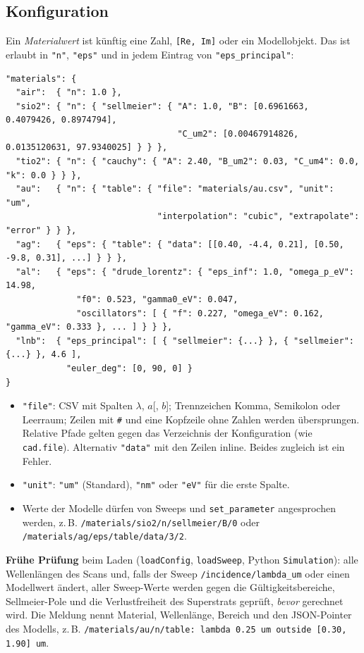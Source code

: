\subsection{Konfiguration}\label{sec:disp_config}
Ein \emph{Materialwert} ist künftig eine Zahl, \verb|[Re, Im]| oder ein Modellobjekt. Das ist erlaubt in
\verb|"n"|, \verb|"eps"| und in jedem Eintrag von \verb|"eps_principal"|:
\begin{verbatim}
"materials": {
  "air":  { "n": 1.0 },
  "sio2": { "n": { "sellmeier": { "A": 1.0, "B": [0.6961663, 0.4079426, 0.8974794],
                                  "C_um2": [0.00467914826, 0.0135120631, 97.9340025] } } },
  "tio2": { "n": { "cauchy": { "A": 2.40, "B_um2": 0.03, "C_um4": 0.0, "k": 0.0 } } },
  "au":   { "n": { "table": { "file": "materials/au.csv", "unit": "um",
                              "interpolation": "cubic", "extrapolate": "error" } } },
  "ag":   { "eps": { "table": { "data": [[0.40, -4.4, 0.21], [0.50, -9.8, 0.31], ...] } } },
  "al":   { "eps": { "drude_lorentz": { "eps_inf": 1.0, "omega_p_eV": 14.98,
              "f0": 0.523, "gamma0_eV": 0.047,
              "oscillators": [ { "f": 0.227, "omega_eV": 0.162, "gamma_eV": 0.333 }, ... ] } } },
  "lnb":  { "eps_principal": [ { "sellmeier": {...} }, { "sellmeier": {...} }, 4.6 ],
            "euler_deg": [0, 90, 0] }
}
\end{verbatim}
\begin{itemize}[nosep]
  \item \verb|"file"|: CSV mit Spalten $\lambda$, $a$[, $b$]; Trennzeichen Komma, Semikolon oder Leerraum; Zeilen mit
        \verb|#| und eine Kopfzeile ohne Zahlen werden übersprungen. Relative Pfade gelten gegen das Verzeichnis der
        Konfiguration (wie \verb|cad.file|). Alternativ \verb|"data"| mit den Zeilen inline. Beides zugleich ist ein
        Fehler.
  \item \verb|"unit"|: \verb|"um"| (Standard), \verb|"nm"| oder \verb|"eV"| für die erste Spalte.
  \item Werte der Modelle dürfen von Sweeps und \verb|set_parameter| angesprochen werden, z.\,B.
        \verb|/materials/sio2/n/sellmeier/B/0| oder \verb|/materials/ag/eps/table/data/3/2|.
\end{itemize}
\textbf{Frühe Prüfung} beim Laden (\verb|loadConfig|, \verb|loadSweep|, Python \verb|Simulation|): alle
Wellenlängen des Scans und, falls der Sweep \verb|/incidence/lambda_um| oder einen Modellwert ändert, aller
Sweep-Werte werden gegen die Gültigkeitsbereiche, Sellmeier-Pole und die Verlustfreiheit des Superstrats geprüft,
\emph{bevor} gerechnet wird. Die Meldung nennt Material, Wellenlänge, Bereich und den JSON-Pointer des Modells,
z.\,B. \verb|/materials/au/n/table: lambda 0.25 um outside [0.30, 1.90] um|.

